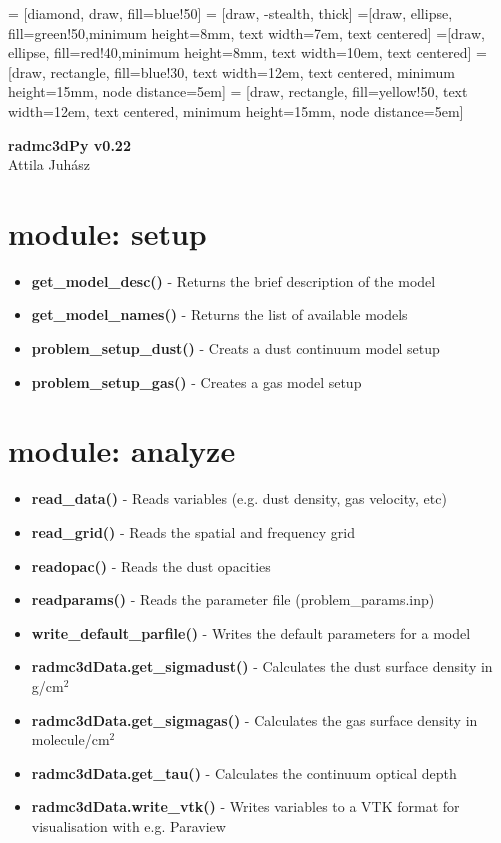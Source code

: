 \documentclass[12pt]{article}
\begin{document}
 = [diamond, draw, fill=blue!50]
 = [draw, -stealth, thick]
=[draw, ellipse, fill=green!50,minimum height=8mm, text width=7em, text centered]
=[draw, ellipse, fill=red!40,minimum height=8mm, text width=10em, text centered]
 = [draw, rectangle, fill=blue!30, text width=12em, text centered, minimum height=15mm, node distance=5em]
 = [draw, rectangle, fill=yellow!50, text width=12em, text centered, minimum height=15mm, node distance=5em]



\begin{center}
{\huge\bf radmc3dPy v0.22}\\
\vspace{0.5cm}
{\large Attila Juh\'asz}
\end{center}

\section*{module: setup}
\begin{itemize}
\item[] {\bf get\_model\_desc()} - Returns the brief description of the model
\item[] {\bf get\_model\_names()} - Returns the list of available models
\item[] {\bf problem\_setup\_dust()} - Creats a dust continuum model setup
\item[] {\bf problem\_setup\_gas()} - Creates a gas model setup
\end{itemize}

\section*{module: analyze}
\begin{itemize}
\item[]{\bf read\_data()} - Reads variables (e.g. dust density, gas velocity, etc)
\item[]{\bf read\_grid()} - Reads the spatial and frequency grid
\item[]{\bf readopac()} - Reads the dust opacities
\item[]{\bf readparams()} - Reads the parameter file (problem\_params.inp)
\item[]{\bf write\_default\_parfile()} - Writes the default parameters for a model
\item[]{\bf radmc3dData.get\_sigmadust()} - Calculates the dust surface density in g/cm$^2$
\item[]{\bf radmc3dData.get\_sigmagas()} - Calculates the gas surface density in molecule/cm$^2$
\item[]{\bf radmc3dData.get\_tau()} - Calculates the continuum optical depth 
\item[]{\bf radmc3dData.write\_vtk()} - Writes variables to a VTK format for visualisation with e.g. Paraview 
\end{itemize}
\end{document}
